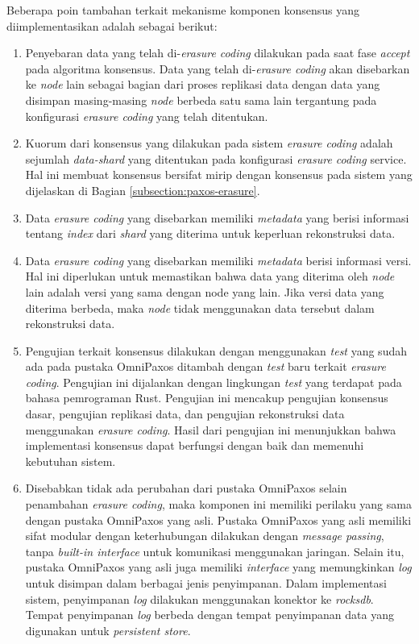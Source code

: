 Beberapa poin tambahan terkait mekanisme komponen konsensus yang diimplementasikan adalah sebagai berikut:
\begin{enumerate}
  \item Penyebaran data yang telah di-\textit{erasure coding} dilakukan pada saat fase \textit{accept} pada algoritma konsensus. Data yang telah di-\textit{erasure coding} akan disebarkan ke \textit{node} lain sebagai bagian dari proses replikasi data dengan data yang disimpan masing-masing \textit{node} berbeda satu sama lain tergantung pada konfigurasi \textit{erasure coding} yang telah ditentukan.
  \item Kuorum dari konsensus yang dilakukan pada sistem \textit{erasure coding} adalah sejumlah \textit{data-shard} yang ditentukan pada konfigurasi \textit{erasure coding} service. Hal ini membuat konsensus bersifat mirip dengan konsensus pada sistem yang dijelaskan di Bagian \ref{subsection:paxos-erasure}.
  \item Data \textit{erasure coding} yang disebarkan memiliki \textit{metadata} yang berisi informasi tentang \textit{index} dari \textit{shard} yang diterima untuk keperluan rekonstruksi data.
  \item Data \textit{erasure coding} yang disebarkan memiliki \textit{metadata} berisi informasi versi. Hal ini diperlukan untuk memastikan bahwa data yang diterima oleh \textit{node} lain adalah versi yang sama dengan node yang lain. Jika versi data yang diterima berbeda, maka \textit{node} tidak menggunakan data tersebut dalam rekonstruksi data.
  \item Pengujian terkait konsensus dilakukan dengan menggunakan \textit{test} yang sudah ada pada pustaka OmniPaxos ditambah dengan \textit{test} baru terkait \textit{erasure coding}. Pengujian ini dijalankan dengan lingkungan \textit{test} yang terdapat pada bahasa pemrograman Rust. Pengujian ini mencakup pengujian konsensus dasar, pengujian replikasi data, dan pengujian rekonstruksi data menggunakan \textit{erasure coding}. Hasil dari pengujian ini menunjukkan bahwa implementasi konsensus dapat berfungsi dengan baik dan memenuhi kebutuhan sistem.
  \item Disebabkan tidak ada perubahan dari pustaka OmniPaxos selain penambahan \textit{erasure coding}, maka komponen ini memiliki perilaku yang sama dengan pustaka OmniPaxos yang asli. Pustaka OmniPaxos yang asli memiliki sifat modular dengan keterhubungan dilakukan dengan \textit{message passing}, tanpa \textit{built-in interface} untuk komunikasi menggunakan jaringan. Selain itu, pustaka OmniPaxos yang asli juga memiliki \textit{interface} yang memungkinkan \textit{log} untuk disimpan dalam berbagai jenis penyimpanan. Dalam implementasi sistem, penyimpanan \textit{log} dilakukan menggunakan konektor ke \textit{rocksdb}. Tempat penyimpanan \textit{log} berbeda dengan tempat penyimpanan data yang digunakan untuk \textit{persistent store}.
\end{enumerate}

